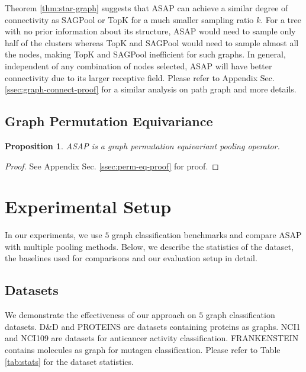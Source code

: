 \documentclass[letterpaper]{article} \usepackage{aaai20}  \usepackage{times}  \usepackage{helvet} \usepackage{courier}  \usepackage[hyphens]{url}  \usepackage{graphicx} \urlstyle{rm} \def\UrlFont{\rm}  \usepackage{graphicx}  \frenchspacing  \setlength{\pdfpagewidth}{8.5in}  \setlength{\pdfpageheight}{11in}
\newtheorem{proposition}{Proposition}
\begin{document}
\noindent Theorem \ref{thm:star-graph} suggests that ASAP can achieve a similar degree of connectivity as SAGPool or TopK for a much smaller sampling ratio $k$. For a tree with no prior information about its structure, ASAP would need to sample only half of the clusters whereas TopK and SAGPool would need to sample almost all the nodes, making TopK and SAGPool inefficient for such graphs. In general, independent of any combination of nodes selected, ASAP will have better connectivity due to its larger receptive field. Please refer to Appendix Sec. \ref{ssec:graph-connect-proof} for a similar analysis on path graph and more details.


 
\subsection{Graph Permutation Equivariance}

\begin{proposition}
ASAP is a graph permutation equivariant pooling operator. 
\end{proposition}
\begin{proof}
See Appendix Sec. \ref{ssec:perm-eq-proof} for proof.
\end{proof}


 
\section{Experimental Setup}
In our experiments, we use $5$ graph classification benchmarks and compare ASAP with multiple pooling methods. Below, we describe the statistics of the dataset, the baselines used for comparisons and our evaluation setup in detail.

\subsection{Datasets}
We demonstrate the effectiveness of our approach on $5$ graph classification datasets. D\&D \cite{dd1,dd2-proteins} and PROTEINS \cite{dd2-proteins,proteins} are datasets containing proteins as graphs. NCI1 \cite{nci1} and NCI109 are datasets for anticancer activity classification. FRANKENSTEIN \cite{frankenstein} contains molecules as graph for mutagen classification. Please refer to Table \ref{tab:stats} for the dataset statistics.
\end{document}
